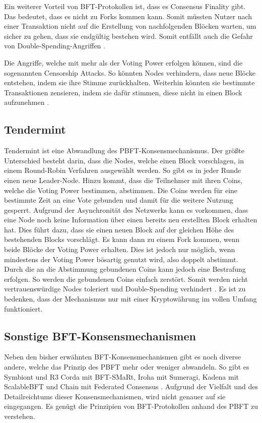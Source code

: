 Ein weiterer Vorteil von \acs{BFT}-Protokollen ist, dass es Consensus Finality gibt. Das bedeutet, dass es nicht zu Forks kommen kann. Somit müssten Nutzer nach einer Transaktion nicht auf die Erstellung von nachfolgenden Blöcken warten, um sicher zu gehen, dass sie endgültig bestehen wird. Somit entfällt auch die Gefahr von Double-Spending-Angriffen \cite{Vukolicquestscalableblockchain2015}.

Die Angriffe, welche mit mehr als  der Voting Power erfolgen können, sind die sogenannten Censorship Attacks. So könnten Nodes verhindern, dass neue Blöcke entstehen, indem sie ihre Stimme zurückhalten. Weiterhin könnten sie bestimmte Transaktionen zensieren, indem sie dafür stimmen, diese nicht in einen Block aufzunehmen \cite{TendermintTeamTendermintGithubRepository2018}.

\subsection{Tendermint}
Tendermint ist eine Abwandlung des \acs{PBFT}-Konsensmechanismus. Der größte Unterschied besteht darin, dass die Nodes, welche einen Block vorschlagen, in einem Round-Robin Verfahren ausgewählt werden. So gibt es in jeder Runde einen neue Leader-Node. Hinzu kommt, dass die Teilnehmer mit ihren Coins, welche die Voting Power bestimmen, abstimmen. Die Coins werden für eine bestimmte Zeit an eine Vote gebunden und damit für die weitere Nutzung gesperrt. Aufgrund der Asynchronität des Netzwerks kann es vorkommen, dass eine Node noch keine Information über einen bereits neu erstellten Block erhalten hat. Dies führt dazu, dass sie einen neuen Block auf der gleichen Höhe des bestehenden Blocks vorschlägt. Es kann dann zu einem Fork kommen, wenn beide Blöcke  der Voting Power erhalten. Dies ist jedoch nur möglich, wenn mindestens  der Voting Power bösartig genutzt wird, also doppelt abstimmt. Durch die an die Abstimmung gebundenen Coins kann jedoch eine Bestrafung erfolgen. So werden die gebundenen Coins einfach zerstört. Somit werden nicht vertrauenswürdige Nodes toleriert und Double-Spending verhindert \cite{KwonTendermintConsensusmining2014}\cite{BuchmanTendermintByzantineFault2016}. Es ist zu bedenken, dass der Mechanismus nur mit einer Kryptowährung im vollen Umfang funktioniert.

\subsection{Sonstige BFT-Konsensmechanismen}
Neben den bisher erwähnten \acs{BFT}-Konsensmechanismen gibt es noch diverse andere, welche das Prinzip des \acs{PBFT} mehr oder weniger abwandeln. So gibt es Symbiont und R3 Corda mit BFT-SMaRt, Iroha mit Sumeragi, Kadena mit ScalableBFT und Chain mit Federated Consensus \cite{CachinBlockchainConsensusProtocols2017}. Aufgrund der Vielfalt und des Detailreichtums dieser Konsensmechanismen, wird nicht genauer auf sie eingegangen. Es genügt die Prinzipien von \acs{BFT}-Protokollen anhand des \acs{PBFT} zu verstehen.

